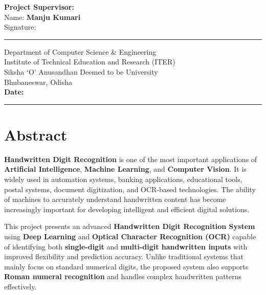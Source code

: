 \documentclass[12pt,a4paper]{article}
\begin{document}
\vspace{0.3cm}

\noindent
\textbf{Project Supervisor:} \\

Name: \textbf{Manju Kumari} \\

Signature: \rule{6cm}{0.4pt}

\vfill

\begin{center}

Department of Computer Science \& Engineering\\
Institute of Technical Education and Research (ITER)\\
Siksha `O' Anusandhan Deemed to be University\\
Bhubaneswar, Odisha\\[0.5cm]

\textbf{Date:} \rule{4cm}{0.4pt}

\end{center}

\newpage
\tableofcontents
\newpage


\section{Abstract}

\vspace{0.3cm}

\noindent
\textbf{Handwritten Digit Recognition} is one of the most important applications of \textbf{Artificial Intelligence}, \textbf{Machine Learning}, and \textbf{Computer Vision}. It is widely used in automation systems, banking applications, educational tools, postal systems, document digitization, and OCR-based technologies. The ability of machines to accurately understand handwritten content has become increasingly important for developing intelligent and efficient digital solutions.

\vspace{0.4cm}

\noindent
This project presents an advanced \textbf{Handwritten Digit Recognition System} using \textbf{Deep Learning} and \textbf{Optical Character Recognition (OCR)} capable of identifying both \textbf{single-digit} and \textbf{multi-digit handwritten inputs} with improved flexibility and prediction accuracy. Unlike traditional systems that mainly focus on standard numerical digits, the proposed system also supports \textbf{Roman numeral recognition} and handles complex handwritten patterns effectively.
\end{document}
